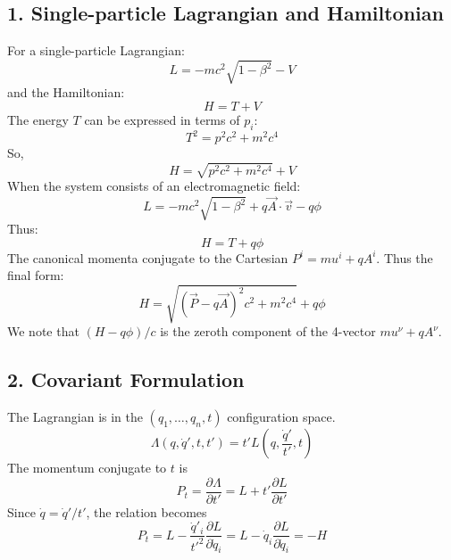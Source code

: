 \documentclass[12pt]{article}
\begin{document}
	\subsection*{1. Single-particle Lagrangian and Hamiltonian}
	For a single-particle Lagrangian:
	\begin{equation}
		L = -mc^2\sqrt{1-\beta^2} - V
	\end{equation}
	and the Hamiltonian:
	\begin{equation}
		H = T + V
	\end{equation}
	The energy $T$ can be expressed in terms of $p_i$:
	\begin{equation}
		T^2 = p^2c^2 + m^2c^4
	\end{equation}
	So,
	\begin{equation}
		H = \sqrt{p^2c^2 + m^2c^4} + V
	\end{equation}
	When the system consists of an electromagnetic field:
	\begin{equation}
		L = -mc^2\sqrt{1-\beta^2} + q\vec{A}\cdot\vec{v} - q\phi
	\end{equation}
	Thus:
	\begin{equation}
		H = T + q\phi
	\end{equation}
	The canonical momenta conjugate to the Cartesian $P^i = mu^i + qA^i$. Thus the final form:
	\begin{equation}
		H = \sqrt{(\vec{P}-q\vec{A})^2c^2 + m^2c^4} + q\phi
	\end{equation}
	We note that $(H-q\phi)/c$ is the zeroth component of the 4-vector $mu^\nu + qA^\nu$.
	
	\subsection*{2. Covariant Formulation}
	The Lagrangian is in the $(q_1, \dots, q_n, t)$ configuration space.
	\begin{equation}
		\Lambda(q, \dot{q}', t, t') = t' L(q, \frac{\dot{q}'}{t'}, t)
	\end{equation}
	The momentum conjugate to $t$ is
	\begin{equation}
		P_t = \frac{\partial\Lambda}{\partial t'} = L + t'\frac{\partial L}{\partial t'}
	\end{equation}
	Since $\dot{q} = \dot{q}'/t'$, the relation becomes
	\begin{equation}
		P_t = L - \frac{\dot{q}'_i}{t'^2}\frac{\partial L}{\partial \dot{q}_i} = L - \dot{q}_i\frac{\partial L}{\partial \dot{q}_i} = -H
	\end{equation}
	
\end{document}
